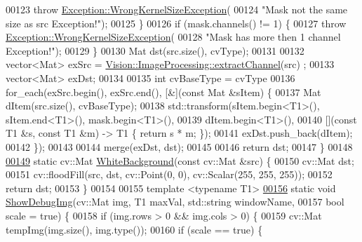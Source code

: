 \begin{DoxyCode}
00123       \textcolor{keywordflow}{throw} \hyperlink{class_vision_1_1_exception_1_1_wrong_kernel_size_exception}{Exception::WrongKernelSizeException}(
00124           \textcolor{stringliteral}{"Mask not the same size as src Exception!"});
00125     \}
00126     \textcolor{keywordflow}{if} (mask.channels() != 1) \{
00127       \textcolor{keywordflow}{throw} \hyperlink{class_vision_1_1_exception_1_1_wrong_kernel_size_exception}{Exception::WrongKernelSizeException}(
00128           \textcolor{stringliteral}{"Mask has more then 1 channel Exception!"});
00129     \}
00130     Mat dst(src.size(), cvType);
00131 
00132     vector<Mat> exSrc = \hyperlink{class_vision_1_1_image_processing_ad5fa51caaabb8cb0fc2c15f645695a3c}{Vision::ImageProcessing::extractChannel}(src)
      ;
00133     vector<Mat> exDst;
00134 
00135     \textcolor{keywordtype}{int} cvBaseType = cvType %
00136     for\_each(exSrc.begin(), exSrc.end(), [&](\textcolor{keyword}{const} Mat &sItem) \{
00137       Mat dItem(src.size(), cvBaseType);
00138       std::transform(sItem.begin<T1>(), sItem.end<T1>(), mask.begin<T1>(),
00139                      dItem.begin<T1>(),
00140                      [](\textcolor{keyword}{const} T1 &s, \textcolor{keyword}{const} T1 &m) -> T1 \{ return s * m; \});
00141       exDst.push\_back(dItem);
00142     \});
00143 
00144     merge(exDst, dst);
00145 
00146     \textcolor{keywordflow}{return} dst;
00147   \}
00148 
\hypertarget{_image_processing_8h_source_l00149}{}\hyperlink{class_vision_1_1_image_processing_aaa8b17b356ca4300857f05a6d6558a43}{00149}   \textcolor{keyword}{static} cv::Mat \hyperlink{class_vision_1_1_image_processing_aaa8b17b356ca4300857f05a6d6558a43}{WhiteBackground}(\textcolor{keyword}{const} cv::Mat &src) \{
00150     cv::Mat dst;
00151     cv::floodFill(src, dst, cv::Point(0, 0), cv::Scalar(255, 255, 255));
00152     \textcolor{keywordflow}{return} dst;
00153   \}
00154 
00155   \textcolor{keyword}{template} <\textcolor{keyword}{typename} T1>
\hypertarget{_image_processing_8h_source_l00156}{}\hyperlink{class_vision_1_1_image_processing_a97407ef83de37496d30d6defe3165edd}{00156}   \textcolor{keyword}{static} \textcolor{keywordtype}{void} \hyperlink{class_vision_1_1_image_processing_a97407ef83de37496d30d6defe3165edd}{ShowDebugImg}(cv::Mat img, T1 maxVal, std::string windowName,
00157                            \textcolor{keywordtype}{bool} scale = \textcolor{keyword}{true}) \{
00158     \textcolor{keywordflow}{if} (img.rows > 0 && img.cols > 0) \{
00159       cv::Mat tempImg(img.size(), img.type());
00160       \textcolor{keywordflow}{if} (scale == \textcolor{keyword}{true}) \{

\end{DoxyCode}
